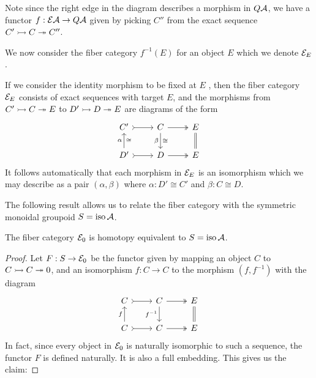 
Note since the right edge in the diagram describes a morphism in $Q\mathcal{A}$,
we have a functor $f : \mathcal{E}\mathcal{A} \to Q\mathcal{A}$ given by picking $C''$ from
the exact sequence $C' \rightarrowtail C \twoheadrightarrow C''$.

We now consider the fiber category $f^{-1}(E)$ for an object $E$ which we denote $\mathcal{E}_E$.

\begin{remark}
If we consider the identity morphism to be fixed at $E$ , then the fiber category
$\mathcal{E}_E$ consists of exact sequences with target $E$, and the morphisms from
$C' \rightarrowtail C \twoheadrightarrow E$ to $D' \rightarrowtail D \twoheadrightarrow E$
are diagrams of the form
\[
\begin{tikzcd}
C' \arrow[r,tail] & C \arrow[r,two heads] \arrow[d, "\cong", "\beta"'] &E \arrow[d,equal] \\
D' \arrow[r,tail] \arrow[u, "\cong"', "\alpha"] & D \arrow[r,two heads] &E
\end{tikzcd}
\]
It follows automatically that each morphism in $\mathcal{E}_E$ is an isomorphism which we may describe as a pair
$(\alpha, \beta)$ where $\alpha : D' \cong C'$ and $\beta : C \cong D$.
\end{remark}

The following result allows us to relate the fiber category with the symmetric monoidal groupoid $S = \operatorname*{iso} \mathcal{A}$.

\begin{proposition}
The fiber category $\mathcal{E}_0$ is homotopy equivalent to $S = \operatorname*{iso} \mathcal{A}$.
\end{proposition}
\begin{proof}
Let $F : S \to \mathcal{E}_0$ be the functor given by mapping an object $C$ to $C \rightarrowtail C \twoheadrightarrow 0$,
and an isomorphism $f : C \to C$ to the morphism $(f, f^{-1})$ with the diagram
\[
\begin{tikzcd}
C \arrow[r,tail] & C \arrow[r,two heads] \arrow[d, "f^{-1}"'] &E \arrow[d,equal] \\
C \arrow[r,tail] \arrow[u, "f"] & C \arrow[r,two heads] &E
\end{tikzcd}
\]
In fact, since every object in $\mathcal{E}_0$ is naturally isomorphic to such a sequence,
the functor $F$ is defined naturally. It is also a full embedding. This gives us the claim:
\end{proof}

